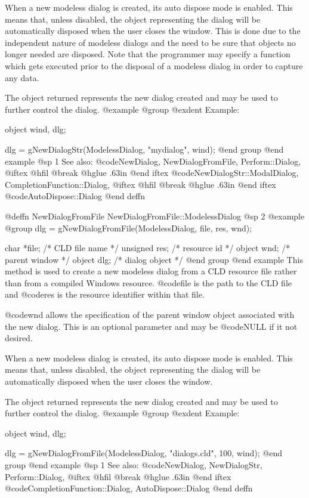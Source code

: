 When a new modeless dialog is created, its auto dispose mode is enabled.
This means that, unless disabled, the object representing the dialog
will be automatically disposed when the user closes the window.  This
is done due to the independent nature of modeless dialogs and the need
to be sure that objects no longer needed are disposed.  Note that the
programmer may specify a function which gets executed prior to the
disposal of a modeless dialog in order to capture any data.

The object returned represents the new dialog created and may be
used to further control the dialog.
@example
@group
@exdent Example:

object  wind, dlg;

dlg = gNewDialogStr(ModelessDialog, "mydialog", wind);
@end group
@end example
@sp 1
See also:  @code{NewDialog, NewDialogFromFile, Perform::Dialog,}
@iftex
@hfil @break @hglue .63in
@end iftex
@code{NewDialogStr::ModalDialog, CompletionFunction::Dialog,}
@iftex
@hfil @break @hglue .63in
@end iftex
@code{AutoDispose::Dialog}
@end deffn




@deffn {NewDialogFromFile} NewDialogFromFile::ModelessDialog
@sp 2
@example
@group
dlg = gNewDialogFromFile(ModelessDialog, file, res, wnd);

char      *file;  /*  CLD file name  */
unsigned  res;    /*  resource id    */
object    wnd;    /*  parent window  */
object    dlg;    /*  dialog object  */
@end group
@end example
This method is used to create a new modeless dialog from a CLD resource
file rather than from a compiled Windows resource.  @code{file} is the
path to the CLD file and @code{res} is the resource identifier within
that file.

@code{wnd} allows the specification of the parent window object associated
with the new dialog.  This is an optional parameter and may be @code{NULL}
if it not desired.

When a new modeless dialog is created, its auto dispose mode is enabled.
This means that, unless disabled, the object representing the dialog
will be automatically disposed when the user closes the window.

The object returned represents the new dialog created and may be
used to further control the dialog.
@example
@group
@exdent Example:

object  wind, dlg;

dlg = gNewDialogFromFile(ModelessDialog, "dialogs.cld", 100, wind);
@end group
@end example
@sp 1
See also:  @code{NewDialog, NewDialogStr, Perform::Dialog,}
@iftex
@hfil @break @hglue .63in
@end iftex
@code{CompletionFunction::Dialog, AutoDispose::Dialog}
@end deffn






